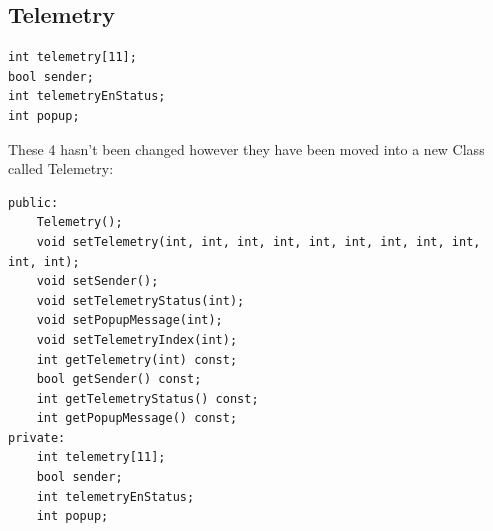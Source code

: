 \documentclass[12pt, letterpaper]{article}
\begin{document}
\subsection{Telemetry}
\begin{verbatim}
int telemetry[11];
bool sender;
int telemetryEnStatus;
int popup;
\end{verbatim}
These 4 hasn't been changed however they have been moved into a new Class called Telemetry:
\begin{verbatim}
public:
    Telemetry();
    void setTelemetry(int, int, int, int, int, int, int, int, int, int, int);
    void setSender();
    void setTelemetryStatus(int);
    void setPopupMessage(int);
    void setTelemetryIndex(int);
    int getTelemetry(int) const;
    bool getSender() const;
    int getTelemetryStatus() const;
    int getPopupMessage() const;
private:
    int telemetry[11];
    bool sender;
    int telemetryEnStatus;
    int popup;
\end{verbatim}
\end{document}
